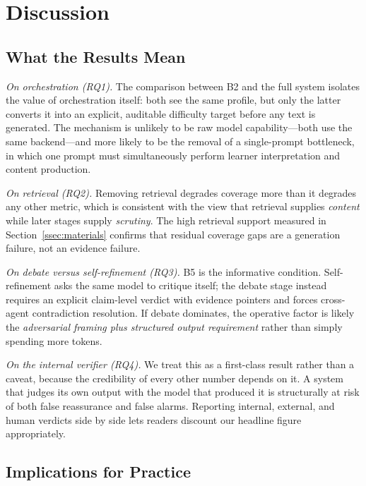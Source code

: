 \section{Discussion}
\label{sec:discussion}

\subsection{What the Results Mean}

\emph{On orchestration (RQ1).} The comparison between B2 and the full system
isolates the value of orchestration itself: both see the same profile, but only
the latter converts it into an explicit, auditable difficulty target before any
text is generated.  The mechanism is unlikely to
be raw model capability---both use the same backend---and more likely to be the
removal of a single-prompt bottleneck, in which one prompt must simultaneously
perform learner interpretation and content production.

\emph{On retrieval (RQ2).} Removing retrieval degrades coverage more than it
degrades any other metric, which is consistent with the view that retrieval
supplies \emph{content} while later stages supply \emph{scrutiny}. The high
retrieval support measured in Section~\ref{ssec:materials} confirms that
residual coverage gaps are a generation failure, not an evidence failure.

\emph{On debate versus self-refinement (RQ3).} B5 is the informative
condition. Self-refinement asks the same model to critique itself; the debate
stage instead requires an explicit claim-level verdict with evidence pointers
and forces cross-agent contradiction resolution.  If debate dominates, the operative factor is likely the
\emph{adversarial framing plus structured output requirement} rather than
simply spending more tokens.

\emph{On the internal verifier (RQ4).} We treat this as a first-class result
rather than a caveat, because the credibility of every other number depends on
it. A system that judges its own output with the model that produced it is
structurally at risk of both false reassurance and false alarms. Reporting
internal, external, and human verdicts side by side lets readers discount our
headline figure appropriately.

\subsection{Implications for Practice}

